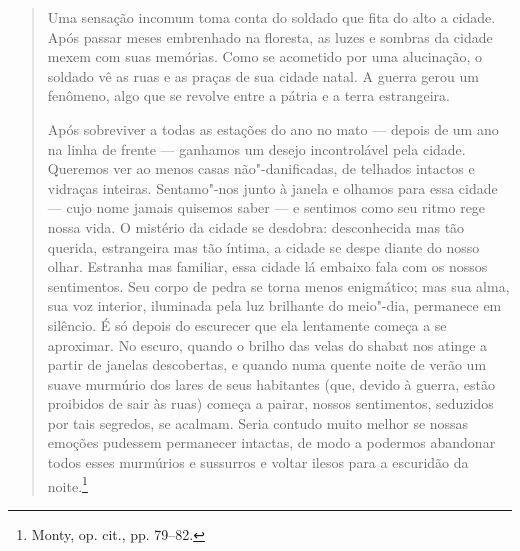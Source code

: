 \begin{quote}
Uma sensação incomum toma conta do soldado que fita do alto a cidade.
Após passar meses embrenhado na floresta, as luzes e sombras da cidade
mexem com suas memórias. Como se acometido por uma alucinação, o soldado
vê as ruas e as praças de sua cidade natal. A guerra gerou um fenômeno,
algo que se revolve entre a pátria e a terra estrangeira.

Após sobreviver a todas as estações do ano no mato --- depois de um ano na
linha de frente --- ganhamos um desejo incontrolável pela cidade. Queremos
ver ao menos casas não"-danificadas, de telhados intactos e vidraças
inteiras. Sentamo"-nos junto à janela e olhamos para essa cidade --- cujo
nome jamais quisemos saber --- e sentimos como seu ritmo rege nossa vida.
O mistério da cidade se desdobra: desconhecida mas tão querida,
estrangeira mas tão íntima, a cidade se despe diante do nosso olhar.
Estranha mas familiar, essa cidade lá embaixo fala com os nossos
sentimentos. Seu corpo de pedra se torna menos enigmático; mas sua alma,
sua voz interior, iluminada pela luz brilhante do meio"-dia, permanece em
silêncio. É só depois do escurecer que ela lentamente começa a se
aproximar. No escuro, quando o brilho das velas do shabat nos atinge a
partir de janelas descobertas, e quando numa quente noite de verão um
suave murmúrio dos lares de seus habitantes (que, devido à guerra, estão
proibidos de sair às ruas) começa a pairar, nossos sentimentos,
seduzidos por tais segredos, se acalmam. Seria contudo muito melhor se
nossas emoções pudessem permanecer intactas, de modo a podermos
abandonar todos esses murmúrios e sussurros e voltar ilesos para a
escuridão da noite.\footnote{Monty, op. cit., pp. 79--82.}
\end{quote}


